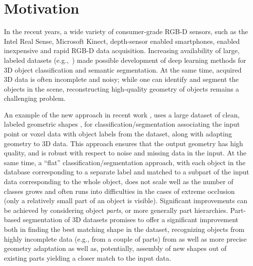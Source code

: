 \section{Motivation}

In the recent years, a wide variety of consumer-grade RGB-D sensors, such as the Intel Real Sense, Microsoft Kinect, depth-sensor enabled smartphones, enabled inexpensive and rapid RGB-D data acquisition. Increasing availability of large, labeled datasets (e.g.,~\cite{chang2017matterport3d,dai2017scannet})  made possible development of deep learning methods for 3D object classification and semantic segmentation. At the same time, acquired 3D data is often incomplete and noisy; while one can identify and segment the objects in the scene, reconstructing high-quality geometry of objects remains a challenging problem.  

An example of the new approach in recent work 
\cite{avetisyan2019scan2cad}, uses a large dataset of clean, labeled geometric shapes
\cite{chang2015shapenet}, for classification/segmentation associating the input point or voxel data with object labels from the dataset, along with adapting geometry to 3D data.  This approach ensures that the output geometry has high quality, and is robust with respect to noise and missing data in the input.  
At the same time, a ``flat'' classification/segmentation approach, with each object in the database corresponding to a separate label and matched to a subpart of the input data corresponding to the whole object, does not scale well as the number of classes grows and often runs into difficulties in the cases of extreme occlusion (only a relatively small part of an object is visible). 
Significant improvements can be achieved by considering object \emph{parts}, or more generally part hierarchies. 
Part-based segmentation of 3D datasets promises to offer a significant improvement both in finding the best matching shape in the dataset, recognizing objects from  highly incomplete data (e.g., from a couple of parts) from  as well as more precise geometry adaptation as well as, potentially, assembly of new shapes out of existing parts yielding a closer match to the input data. 


